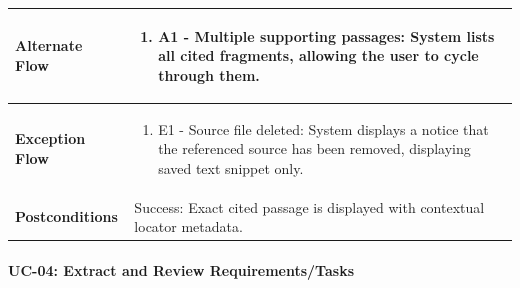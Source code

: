 \begin{longtable}{>{\raggedright\arraybackslash}p{}>{\raggedright\arraybackslash}p{}}
\textbf{Alternate Flow} & \begin{enumerate}[nosep,leftmargin=*,label=\arabic*.]

    \item A1 - Multiple supporting passages: System lists all cited fragments, allowing the user to cycle through them.

\end{enumerate} \\ \hline

\textbf{Exception Flow} & \begin{enumerate}[nosep,leftmargin=*,label=\arabic*.]

    \item E1 - Source file deleted: System displays a notice that the referenced source has been removed, displaying saved text snippet only.

\end{enumerate} \\ \hline

\textbf{Postconditions} & Success: Exact cited passage is displayed with contextual locator metadata. \\ \hline

\end{longtable}

\endgroup





\paragraph*{UC-04: Extract and Review Requirements/Tasks}

\begingroup

\small

\setlength{\tabcolsep}{5pt}

\renewcommand{\arraystretch}{1.1}

